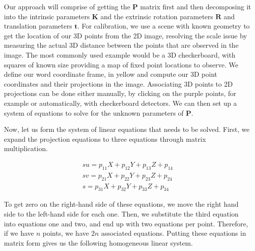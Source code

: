 Our approach will comprise of getting the $\mathbf{P}$ matrix first and
then decomposing it into the intrinsic parameters $\mathbf{K}$ and 
the extrinsic rotation parameters $\mathbf{R}$ and translation parameters $\mathbf{t}$. For calibration, we use a scene with
known geometry to get the location of our 3D points from the 2D image, resolving the scale
issue by measuring the actual 3D distance between the points that
are observed in the image. The most commonly used example would be a 3D checkerboard, with squares of
known size providing a map of fixed point locations to observe. We define our word
coordinate frame, in yellow and compute our 3D point coordinates and
their projections in the image. Associating 3D points to 2D projections can be
done either manually, by clicking on the purple points, for example or automatically, with checkerboard detectors. We can then set up
a system of equations to solve for the unknown parameters of $\mathbf{P}$. 

Now, let us form the system of linear equations that
needs to be solved. First, we expand
the projection equations to three equations through
matrix multiplication. 

\begin{eqnarray}
su = p_{11} X + p_{12} Y + p_{13} Z + p_{14} \\
sv = p_{21} X + p_{22} Y + p_{23} Z + p_{24} \\
s = p_{31} X + p_{32} Y + p_{33} Z + p_{34}
\end{eqnarray}

To get zero on the right-hand side of these equations, we move the right hand side to the left-hand side for each one. Then, we substitute
the third equation into equations one and two, and end up with
two equations per point. Therefore, if we have $n$ points, we have $2n$ associated equations. 
Putting these equations in matrix form gives us the following homogeneous
linear system. 

